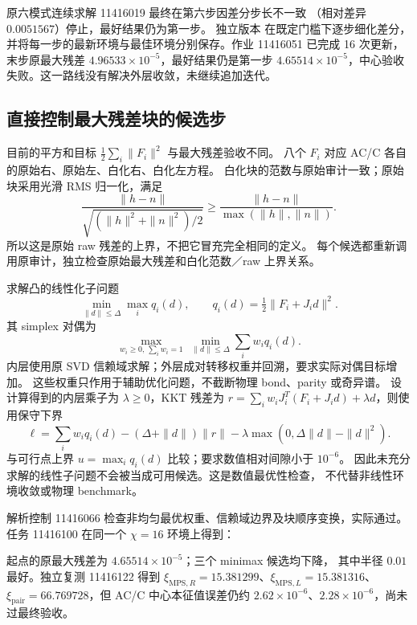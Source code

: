 \documentclass[11pt]{article}
\begin{document}
原六模式连续求解 11416019 最终在第六步因差分步长不一致
（相对差异 $0.0051567$）停止，最好结果仍为第一步。
独立版本  在既定门槛下逐步细化差分，
并将每一步的最新环境与最佳环境分别保存。作业 11416051 已完成 16 次更新，
末步原最大残差 $4.96533\times10^{-5}$，最好结果仍是第一步
$4.65514\times10^{-5}$，中心验收失败。这一路线没有解决外层收敛，未继续追加迭代。

\subsection{直接控制最大残差块的候选步}
目前的平方和目标 $\frac12\sum_i\|F_i\|^2$ 与最大残差验收不同。
八个 $F_i$ 对应 AC/C 各自的原始右、原始左、白化右、白化左方程。
白化块的范数与原始审计一致；原始块采用光滑 RMS 归一化，满足
\begin{equation}
 \frac{\|h-n\|}{\sqrt{(\|h\|^2+\|n\|^2)/2}}
 \geq \frac{\|h-n\|}{\max(\|h\|,\|n\|)}.
\end{equation}
所以这是原始 raw 残差的上界，不把它冒充完全相同的定义。
每个候选都重新调用原审计，独立检查原始最大残差和白化范数／raw 上界关系。

 求解凸的线性化子问题
\begin{equation}
 \min_{\|d\|\leq\Delta}\max_i q_i(d),\qquad
 q_i(d)=\tfrac12\|F_i+J_i d\|^2.
\end{equation}
其 simplex 对偶为
\begin{equation}
 \max_{w_i\geq0,\,\sum_iw_i=1}\ \min_{\|d\|\leq\Delta}\sum_iw_iq_i(d).
\end{equation}
内层使用原 SVD 信赖域求解；外层成对转移权重并回溯，要求实际对偶目标增加。
这些权重只作用于辅助优化问题，不截断物理 bond、parity 或奇异谱。
设计算得到的内层乘子为 $\lambda\geq0$，KKT 残差为
$r=\sum_iw_iJ_i^T(F_i+J_id)+\lambda d$，则使用保守下界
\begin{equation}
 \ell=\sum_iw_iq_i(d)-(\Delta+\|d\|)\|r\|
 -\lambda\max(0,\Delta\|d\|-\|d\|^2).
\end{equation}
与可行点上界 $u=\max_iq_i(d)$ 比较；要求数值相对间隙小于 $10^{-6}$。
因此未充分求解的线性子问题不会被当成可用候选。这是数值最优性检查，
不代替非线性环境收敛或物理 benchmark。

解析控制 11416066 检查非均匀最优权重、信赖域边界及块顺序变换，实际通过。
任务 11416100 在同一个 $\chi=16$ 环境上得到：
\begin{center}\small

\end{center}
起点的原最大残差为 $4.65514\times10^{-5}$；三个 minimax 候选均下降，
其中半径 $0.01$ 最好。独立复测 11416122 得到
$\xi_{\mathrm{MPS},R}=15.381299$、$\xi_{\mathrm{MPS},L}=15.381316$、
$\xi_{\mathrm{pair}}=66.769728$，但 AC/C 中心本征值误差仍约
$2.62\times10^{-6}$、$2.28\times10^{-6}$，尚未过最终验收。
\end{document}
